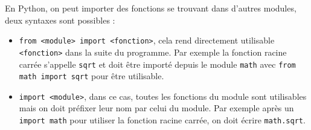 \documentclass[11pt,a4paper]{article}
\begin{document}
	\begin{tcolorbox}[left=0cm,title=\bf{\faPython \; Importation de fonctions},colbacktitle=cfond]
		En Python, on peut importer des fonctions se trouvant dans d'autres modules, deux syntaxes sont possibles :
		\begin{itemize}
			\item[\textbullet] {\tt from <module> import <fonction>}, cela rend directement utilisable {\tt <fonction>} dans la suite du programme. Par exemple la fonction racine carrée s'appelle \texttt{sqrt} et doit être importé depuis le module \texttt{math} avec \texttt{from math import sqrt} pour être utilisable.
			\item[\textbullet] {\tt import <module>}, dans ce cas, toutes les fonctions du module sont utilisables mais on doit préfixer leur nom par celui du module. Par exemple après un \texttt{import math} pour utiliser la fonction racine carrée, on doit écrire \texttt{math.sqrt}.
		\end{itemize}
	\end{tcolorbox}
	
\end{document}

